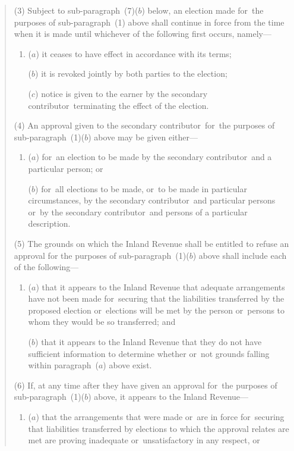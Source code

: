 \documentclass[12pt,a4paper]{article}
\begin{document}
\begin{quotation}
(3) Subject to sub-paragraph~(7)($b$)  below, an election made for~the purposes of sub-paragraph~(1)  above shall continue in force from the time when it is made until whichever of the following first occurs, namely—
\begin{enumerate}\item[]
($a$) it ceases to have effect in accordance with its terms;

($b$) it is revoked jointly by both parties to the election;

($c$) notice is given to the earner by the secondary contributor~terminating the effect of the election.
\end{enumerate}

(4) An approval given to the secondary contributor~for~the purposes of sub-paragraph~(1)($b$)  above may be given either—
\begin{enumerate}\item[]
($a$) for~an election to be made by the secondary contributor~and a particular person; or

($b$) for~all elections to be made, or~to be made in particular circumstances, by the secondary contributor~and particular persons or~by the secondary contributor~and persons of a particular description.
\end{enumerate}

\begin{sloppypar}
(5) The grounds on which the Inland Revenue shall be entitled to refuse an approval for the purposes of sub-paragraph~(1)($b$)  above shall include each of the following—
\end{sloppypar}
\begin{enumerate}\item[]
($a$) that it appears to the Inland Revenue that adequate arrangements have not been made for~securing that the liabilities transferred by the proposed election or~elections will be met by the person or~persons to whom they would be so transferred; and

($b$) that it appears to the Inland Revenue that they do not have sufficient information to determine whether or~not grounds falling within paragraph~($a$)  above exist.
\end{enumerate}

(6) If, at any time after they have given an approval for~the purposes of sub-paragraph~(1)($b$)  above, it appears to the Inland Revenue—
\begin{enumerate}\item[]
($a$) that the arrangements that were made or~are in force for~securing that liabilities transferred by elections to which the approval relates are met are proving inadequate or~unsatisfactory in any respect, or


\end{enumerate}
\end{quotation}
\end{document}
